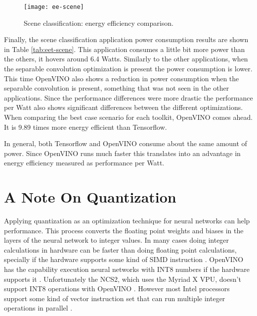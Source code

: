 \begin{figure}[thbp]
	\centering
	\texttt{[image: ee-scene]}
	\caption{Scene classification: energy efficiency comparison.}
	\label{fig:ee-scene}
\end{figure}

Finally, the scene classification application power consumption results are shown in Table \ref{tab:eet-scene}. This application consumes a little bit more power than the others, it hovers around 6.4 Watts. Similarly to the other applications, when the separable convolution optimization is present the power consumption is lower. This time OpenVINO also shows a reduction in power consumption when the separable convolution is present, something that was not seen in the other applications. Since the performance differences were more drastic the performance per Watt also shows significant differences between the different optimizations. When comparing the best case scenario for each toolkit, OpenVINO comes ahead. It is 9.89 times more energy efficient than Tensorflow.

In general, both Tensorflow and OpenVINO consume about the same amount of power. Since OpenVINO runs much faster this translates into an advantage in energy efficiency measured as performance per Watt.

\section{A Note On Quantization}





Applying quantization as an optimization technique for neural networks can help performance. This process converts the floating point weights and biases in the layers of the neural network to integer values. In many cases doing integer calculations in hardware can be faster than doing floating point calculations, specially if the hardware supports some kind of SIMD instruction \cite{quant1}. OpenVINO has the capability execution neural networks with INT8 numbers if the hardware supports it \cite{int8}. Unfortunately the NCS2, which uses the Myriad X VPU, doesn't support INT8 operations with OpenVINO \cite{ov_sup_formats}. However most Intel processors support some kind of vector instruction set that can run multiple integer operations in parallel \cite{avx}.

